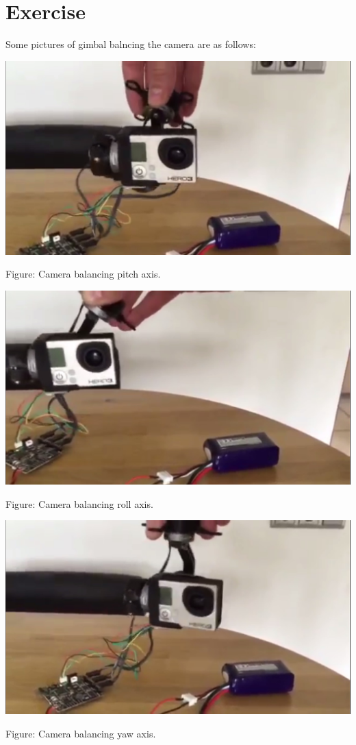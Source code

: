 \documentclass[11pt,a4paper]{article}
\begin{document}
	\section{Exercise}
	Some pictures of gimbal balncing the camera are as follows:
	\begin{center}
		\includegraphics[scale=0.4]{balancing_pitch_axis.jpg}
	\end{center}
	\begin{center}
		Figure: Camera balancing pitch axis.
	\end{center}
	\begin{center}
		\includegraphics[scale=0.4]{balancing_roll_axis.jpg}
	\end{center}
	\begin{center}
		Figure: Camera balancing roll axis.
	\end{center}
	\begin{center}
		\includegraphics[scale=0.4]{balancing_yaw_axis.jpg}
	\end{center}
	\begin{center}
		Figure: Camera balancing yaw axis.
	\end{center}
\end{document}
